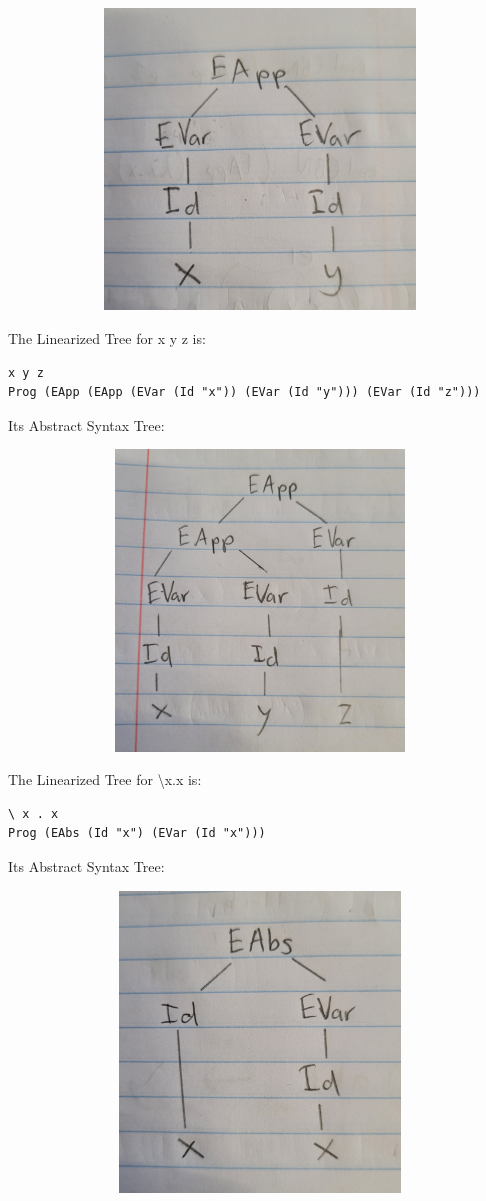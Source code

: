 \documentclass{article}
\theoremstyle{theorem}
\theoremstyle{definition}
\theoremstyle{remark}
\begin{document}
\includegraphics[width=15cm, height=8cm]{Report Images/week5_3.jpg}

The Linearized Tree for x y z is:
\begin{lstlisting}
x y z
Prog (EApp (EApp (EVar (Id "x")) (EVar (Id "y"))) (EVar (Id "z")))
\end{lstlisting}

Its Abstract Syntax Tree:

\includegraphics[width=15cm, height=8cm]{Report Images/week5_4.jpg}

The Linearized Tree for \textbackslash  x.x is:
\begin{lstlisting}
\ x . x
Prog (EAbs (Id "x") (EVar (Id "x")))
\end{lstlisting}

Its Abstract Syntax Tree:

\includegraphics[width=15cm, height=8cm]{Report Images/week5_5.jpg}
\end{document}
